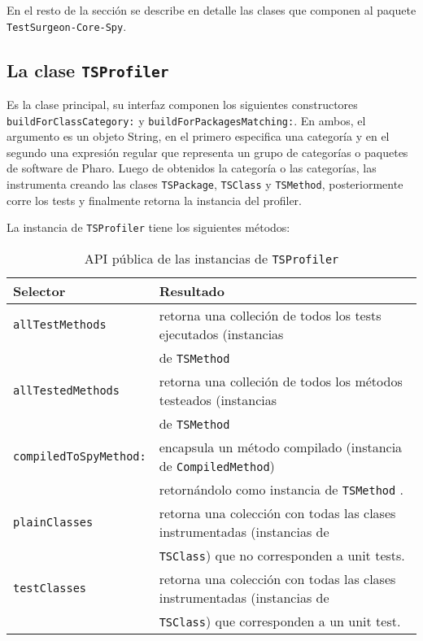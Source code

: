 \par En el resto de la sección se describe en detalle las clases que componen al paquete {\tt TestSurgeon-Core-Spy}.

\subsection{La clase {\tt TSProfiler}}

\par Es la clase principal, su interfaz componen los siguientes constructores {\tt buildForClassCategory:} y {\tt buildForPackagesMatching:}. En ambos, el argumento es un objeto String, en el primero especifica una categoría y en el segundo una expresión regular que representa un grupo de categorías o paquetes de software de Pharo. Luego de obtenidos la categoría o las categorías, las instrumenta creando las clases {\tt TSPackage}, {\tt TSClass} y {\tt TSMethod}, posteriormente corre los tests y finalmente retorna la instancia del profiler.

\par La instancia de {\tt TSProfiler} tiene los siguientes métodos:

\begin{table}[h] 
    \centering 
    \begin{tabular}{|l|l|}
    	\hline
\textbf{Selector} & \textbf{Resultado} \\ \hline \hline
{\tt allTestMethods}	& retorna una colleción de todos los tests ejecutados (instancias\\
						&  de {\tt TSMethod}  \\ \hline
{\tt allTestedMethods} & retorna una colleción de todos los métodos testeados (instancias  \\
						& de {\tt TSMethod} \\ \hline
{\tt compiledToSpyMethod:} & encapsula un método compilado (instancia de {\tt CompiledMethod}) \\
						& retornándolo como instancia de {\tt TSMethod} . \\ \hline
{\tt plainClasses} & retorna una colección con todas las clases instrumentadas (instancias de  \\ 
						&{\tt TSClass}) que no corresponden a unit tests. \\ \hline
{\tt testClasses} & retorna una colección con todas las clases instrumentadas (instancias de \\ 
						&{\tt TSClass}) que corresponden a un unit test. \\ \hline
    \end{tabular}
    \caption{API pública de las instancias de {\tt TSProfiler}}
\end{table} 


